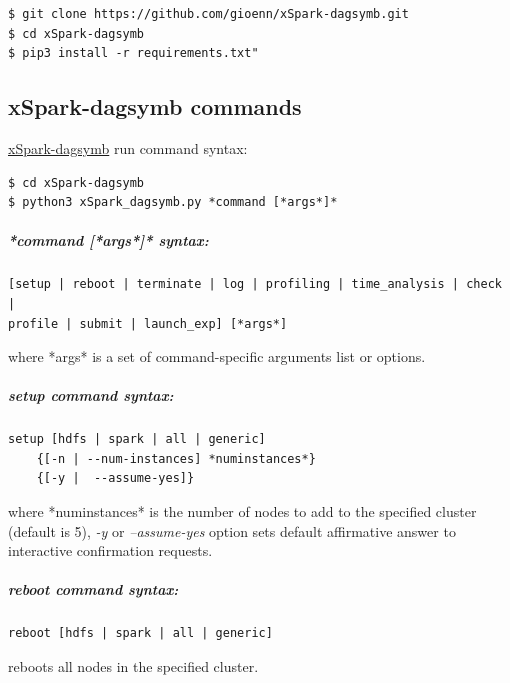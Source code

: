 \begin{verbatim}
$ git clone https://github.com/gioenn/xSpark-dagsymb.git
$ cd xSpark-dagsymb
$ pip3 install -r requirements.txt"
\end{verbatim}

\hypertarget{xspark-dagsymb-commands}{%
\subsection{xSpark-dagsymb commands}\label{xspark-dagsymb-commands}}

\href{https://github.com/gioenn/xSpark-dagsymb}{xSpark-dagsymb} run
command syntax:

\begin{verbatim}
$ cd xSpark-dagsymb
$ python3 xSpark_dagsymb.py *command [*args*]*
\end{verbatim}

\hypertarget{command-args-syntax}{%
\subparagraph{*command {[}*args*{]}*
	syntax:}\label{command-args-syntax}}

\begin{verbatim}
[setup | reboot | terminate | log | profiling | time_analysis | check | 
profile | submit | launch_exp] [*args*]
\end{verbatim}

where *args* is a set of command-specific arguments list or options.

\hypertarget{setup-command-syntax}{%
\subparagraph{\texorpdfstring{\emph{setup} command
		syntax:}{setup command syntax:}}\label{setup-command-syntax}}

\begin{verbatim}
setup [hdfs | spark | all | generic] 
    {[-n | --num-instances] *numinstances*} 
    {[-y |  --assume-yes]}
\end{verbatim}

where *numinstances* is the number of nodes to add to the specified
cluster (default is 5), \emph{-y} or \emph{--assume-yes} option sets
default affirmative answer to interactive confirmation requests.

\hypertarget{reboot-command-syntax}{%
\subparagraph{\texorpdfstring{\emph{reboot} command
		syntax:}{reboot command syntax:}}\label{reboot-command-syntax}}

\begin{verbatim}
reboot [hdfs | spark | all | generic]
\end{verbatim}

reboots all nodes in the specified cluster.

